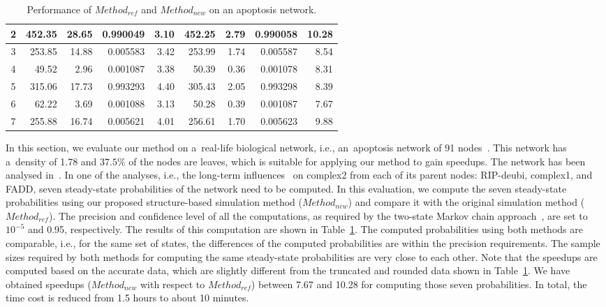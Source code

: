 \documentclass[runningheads,a4paper]{llncs}
\begin{document}
\begin{table}[!t]
\begin{tabular}{|c|r|r|r||r|r|r|r||r|}
2           & 452.35	                                                 & 28.65	 &0.990049    & 3.10           & 452.25	   &2.79	 &0.990058& 10.28                                   \\ \hline
3           &253.85	                 & 14.88	    &0.005583                 & 3.42          & 253.99	       & 1.74&0.005587	                & 8.54       \\ \hline
4           & 49.52	    & 2.96	   &0.001087          & 3.38           &50.39	                                                                        & 0.36	&0.001078 & 8.31       \\ \hline
5           & 315.06	                                                                   &17.73	      &0.993293      & 4.40         &305.43    & 	2.05 & 	0.993298&8.39       \\ \hline
6           & 62.22	                                      & 3.69	&0.001088         & 3.13          & 50.28	           & 0.39	&0.001087            & 7.67     \\ \hline
7           & 255.88	                  &16.74	    &0.005621          & 4.01           & 256.61	      & 1.70	         &0.005623    & 9.88       \\ \hline
\end{tabular}
\caption{Performance of {\sf $Method_{ref}$} and {\sf $Method_{new}$} on an apoptosis network.}
\label{tab:case-study}
\end{table}
In this section, we evaluate our method on a~real-life biological network, i.e., an~apoptosis
network of 91 nodes~\cite{SSVSSBEMS09}. This network has a~density of 1.78 and $37.5\%$ of the
nodes are leaves, which is suitable for applying our method to gain speedups. The network has been
analysed in~\cite{MPY15}. In one of the analyses, i.e., the long-term influences~\cite{SDKZ02} on
complex2 from each of its parent nodes: RIP-deubi, complex1, and FADD, seven steady-state
probabilities of the network need to be computed. In this evaluation,
we compute the seven steady-state probabilities using our proposed structure-based simulation
method ({\sf $Method_{new}$}) and compare it with the original simulation method
({\sf $Method_{ref}$}). The precision and confidence level of all the computations, as required by
the two-state Markov chain approach~\cite{RL92}, are set to $10^{-5}$ and 0.95, respectively. The
results of this computation are shown in Table~\ref{tab:case-study}.
The computed probabilities using both methods are comparable,
i.e., for the same set of states, the differences of the computed probabilities are within the precision requirements.
The sample sizes required by both methods for computing the same steady-state probabilities are very close to each other.
Note that the speedups are computed based on the accurate data, which are slightly different from the
truncated and rounded data shown in Table~\ref{tab:case-study}. We have obtained speedups
({\sf $Method_{new}$} with respect to {\sf $Method_{ref}$}) between 7.67 and 10.28 for computing
those seven probabilities. In total, the time cost is reduced from 1.5 hours to about 10 minutes.
\end{document}
